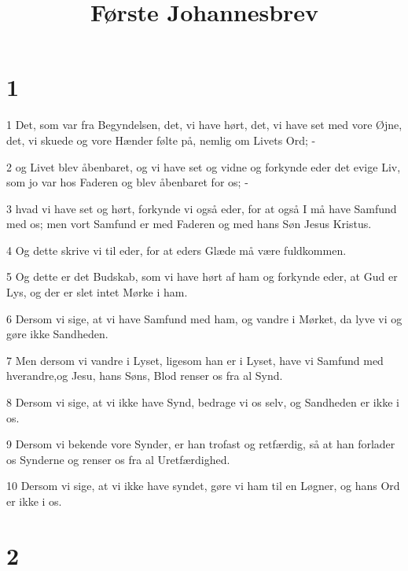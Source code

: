 

\title{Første Johannesbrev}


\chapter{1}

\par 1 Det, som var fra Begyndelsen, det, vi have hørt, det, vi have set med vore Øjne, det, vi skuede og vore Hænder følte på, nemlig om Livets Ord; -
\par 2 og Livet blev åbenbaret, og vi have set og vidne og forkynde eder det evige Liv, som jo var hos Faderen og blev åbenbaret for os; -
\par 3 hvad vi have set og hørt, forkynde vi også eder, for at også I må have Samfund med os; men vort Samfund er med Faderen og med hans Søn Jesus Kristus.
\par 4 Og dette skrive vi til eder, for at eders Glæde må være fuldkommen.
\par 5 Og dette er det Budskab, som vi have hørt af ham og forkynde eder, at Gud er Lys, og der er slet intet Mørke i ham.
\par 6 Dersom vi sige, at vi have Samfund med ham, og vandre i Mørket, da lyve vi og gøre ikke Sandheden.
\par 7 Men dersom vi vandre i Lyset, ligesom han er i Lyset, have vi Samfund med hverandre,og Jesu, hans Søns, Blod renser os fra al Synd.
\par 8 Dersom vi sige, at vi ikke have Synd, bedrage vi os selv, og Sandheden er ikke i os.
\par 9 Dersom vi bekende vore Synder, er han trofast og retfærdig, så at han forlader os Synderne og renser os fra al Uretfærdighed.
\par 10 Dersom vi sige, at vi ikke have syndet, gøre vi ham til en Løgner, og hans Ord er ikke i os.

\chapter{2}

